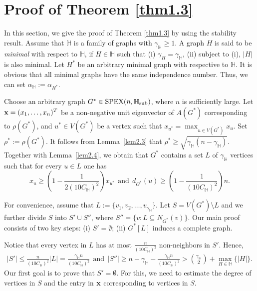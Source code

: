 \documentclass[11pt, a4paper]{article}
\theoremstyle{definition}
\newcommand{\<}{\subseteq}
\begin{document}
\section{Proof of Theorem \ref{thm1.3}}\label{sec3}
In this section, we give the proof of Theorem \ref{thm1.3} by using the stability result. Assume that  $\mathbb{H}$ is a family of graphs with $\gamma_{\mathbb{H}}\geq 1$. A graph $H$ is said to be \textit{minimal} with respect to $\mathbb{H}$, if $H\in \mathbb{H}$ such that (i) $\gamma_H=\gamma_{\mathbb{H}}$, (ii) subject to (i), $|H|$ is also minimal. Let $H^*$ be an arbitrary minimal graph with respective to $\mathbb{H}$. It is obvious that all minimal graphs have the same independence number. Thus, we can set $\alpha_{\mathbb{H}}:=\alpha_{H^*}$. 

Choose an arbitrary graph $G^* \in {\rm SPEX}(n,\mathbb{H}_{\rm sub})$, where $n$ is sufficiently large. 
Let ${\bf x}=(x_{1},\ldots,x_{n})^T$ be a non-negative unit eigenvector of 
$A(G^*)$  corresponding to $\rho(G^*)$, and $u^{*} \in V(G^*)$ be a vertex such that $x_{u^{*}}=\max_{u \in  V(G^*)}x_{u}$.
Set $\rho^{*}:=\rho(G^*)$.
It follows from Lemma~\ref{lem2.3} that  $\rho^{*}\geq \sqrt{\gamma_\mathbb{H}(n-\gamma_\mathbb{H})}$. Together with Lemma~\ref{lem2.4}, we obtain that $G^*$ contains a set $L$ of $\gamma_\mathbb{H}$ vertices such that for every $u \in L$ one has 
$$x_{u} \geq \left(1-\frac{1}{2(10C_\mathbb{H})^{2}}\right)x_{u^{*}}\ \ \text{and}\ \ d_{G^*}(u) \geq \left(1-\frac{1}{(10C_\mathbb{H})^{2}}\right)n.
$$ 

For convenience, assume that $L:=\{v_1,v_2,\ldots ,v_{\gamma_\mathbb{H}}\}$.   
Let $S=V(G^*)\setminus L$ %
and we further divide $S$ into $S'\cup S''$, where $S''=\{v:L\subseteq N_{G^*}(v)\}$. Our main proof consists of two key steps: (i) $S'=\emptyset$; (ii) $G^*[L]$ induces a complete graph. 



Notice that every vertex in $L$ has at most $\frac{n}{(10C_\mathbb{H})^2}$ non-neighbors in $S'$.
Hence, %
\begin{align}\label{eq:1}
    |S'|\leq\frac{n}{(10C_\mathbb{H})^2}|L|=\frac{\gamma_\mathbb{H}n}{(10C_\mathbb{H})^2}\ \ \text{and}\ \ |S''|\geq n-\gamma_\mathbb{H}-\frac{\gamma_\mathbb{H}n}{(10C_\mathbb{H})^2}>\binom{\gamma_\mathbb{H}}{2}+\max_{H\in \mathbb{H}}\{|H|\}.
\end{align}
Our first goal is to prove that $S'=\emptyset$. {For this, we need to estimate the degree of vertices in $S$ and the entry in ${\bf x}$ corresponding to vertices in $S$.} 
\end{document}
